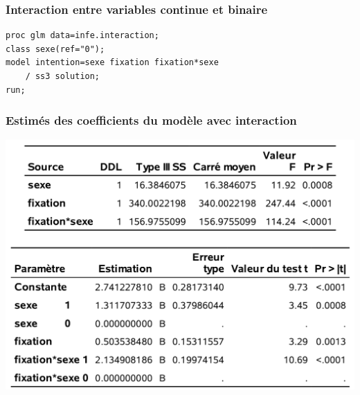 \documentclass[xcolor={dvipsnames}]{beamer}
\begin{document}
 \begin{frame}[fragile]
\frametitle{Interaction entre variables continue et binaire}
\begin{tcolorbox}[colback=white,colframe=hecblue,title=Code \SASlang pour ajuster le modèle linéaire avec une interaction]
{\small 
\begin{verbatim}
proc glm data=infe.interaction;
class sexe(ref="0");
model intention=sexe fixation fixation*sexe 
    / ss3 solution;
run;
\end{verbatim}
}
\end{tcolorbox}
\end{frame}
\begin{frame}
\frametitle{Estimés des coefficients du modèle avec interaction}
\begin{center}
  \includegraphics[width = 0.8\linewidth]{img/c2/diapos3-e19}
\end{center}

\end{frame}
\end{document}
